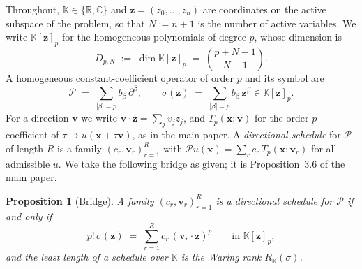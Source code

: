 \documentclass[final]{siamltex}
\newtheorem{proposition}[proposition]{Proposition}
\newcommand{\R}{\mathbb{R}}
\newcommand{\C}{\mathbb{C}}
\newcommand{\K}{\mathbb{K}}
\newcommand{\bx}{\bm{x}}
\newcommand{\bz}{\bm{z}}
\newcommand{\bv}{\bm{v}}
\newcommand{\Tp}{T_{p}}
\newcommand{\abs}[1]{\left|#1\right|}
\begin{document}
Throughout, $\K \in \{\R,\C\}$ and $\bz = (z_{0},\ldots,z_{n})$ are coordinates
on the active subspace of the problem, so that $N := n+1$ is the number of
active variables.  We write $\K[\bz]_{p}$ for the homogeneous polynomials of
degree $p$, whose dimension is
\begin{equation}\label{eq_dim}
  D_{p,N} \;:=\; \dim \K[\bz]_{p} \;=\; \binom{p+N-1}{N-1}.
\end{equation}
A homogeneous constant-coefficient operator of order $p$ and its symbol are
\begin{equation}\label{eq_symbol}
  \mathcal{P} \;=\; \sum_{\abs{\beta}=p} b_{\beta}\,\partial^{\beta},
  \qquad
  \sigma(\bz) \;=\; \sum_{\abs{\beta}=p} b_{\beta}\,\bz^{\beta} \in \K[\bz]_{p}.
\end{equation}
For a direction $\bv$ we write $\bv \cdot \bz = \sum_{j} v_{j} z_{j}$, and
$\Tp(\bx;\bv)$ for the order-$p$ coefficient of $\tau \mapsto u(\bx + \tau\bv)$,
as in the main paper.  A \emph{directional schedule} for $\mathcal{P}$ of length
$R$ is a family $(c_{r},\bv_{r})_{r=1}^{R}$ with
$\mathcal{P}u(\bx) = \sum_{r} c_{r}\,\Tp(\bx;\bv_{r})$ for all admissible $u$.
We take the following bridge as given; it is Proposition~3.6 of the main paper.

\begin{proposition}[Bridge]\label{prop_bridge}
  A family $(c_{r},\bv_{r})_{r=1}^{R}$ is a directional schedule for
  $\mathcal{P}$ if and only if
  \begin{equation}\label{eq_bridge}
    p!\,\sigma(\bz) \;=\; \sum_{r=1}^{R} c_{r}\,(\bv_{r}\cdot\bz)^{p}
    \qquad\text{in }\K[\bz]_{p},
  \end{equation}
  and the least length of a schedule over $\K$ is the Waring rank
  $R_{\K}(\sigma)$.
\end{proposition}
\end{document}
